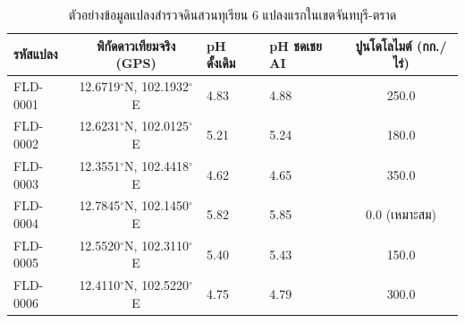 \begin{table}[H]
\caption{ตัวอย่างข้อมูลแปลงสำรวจดินสวนทุเรียน 6 แปลงแรกในเขตจันทบุรี-ตราด}
\label{tab:sample_field_data}
\centering
\begin{tabularx}{\textwidth}{p{2.5cm}cZZc}
\toprule
\textbf{รหัสแปลง} & \textbf{พิกัดดาวเทียมจริง (GPS)} & \textbf{pH ดั้งเดิม} & \textbf{pH ชดเชย AI} & \textbf{ปูนโดโลไมต์ (กก./ไร่)} \\
\midrule
FLD-0001 & 12.6719$^\circ$N, 102.1932$^\circ$E & 4.83 & 4.88 & 250.0 \\
FLD-0002 & 12.6231$^\circ$N, 102.0125$^\circ$E & 5.21 & 5.24 & 180.0 \\
FLD-0003 & 12.3551$^\circ$N, 102.4418$^\circ$E & 4.62 & 4.65 & 350.0 \\
FLD-0004 & 12.7845$^\circ$N, 102.1450$^\circ$E & 5.82 & 5.85 & 0.0 (เหมาะสม) \\
FLD-0005 & 12.5520$^\circ$N, 102.3110$^\circ$E & 5.40 & 5.43 & 150.0 \\
FLD-0006 & 12.4110$^\circ$N, 102.5220$^\circ$E & 4.75 & 4.79 & 300.0 \\
\bottomrule
\end{tabularx}
\end{table}

\clearpage
